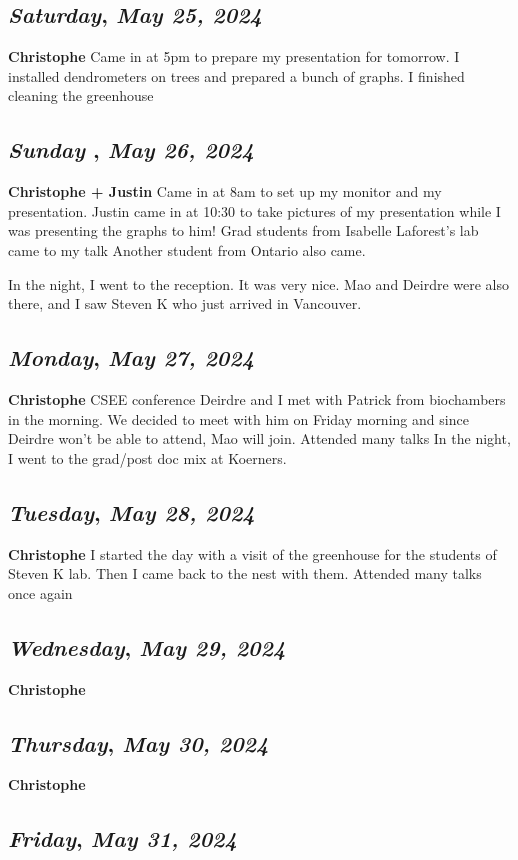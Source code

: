 \def\day{\textit{May 25, 2024}}
\def\weekday{\textit{Saturday}}
\subsection*{\weekday, \day}
\textbf{Christophe}
Came in at 5pm to prepare my presentation for tomorrow. 
I installed dendrometers on trees and prepared a bunch of graphs.
I finished cleaning the greenhouse

\def\day{\textit{May 26, 2024}}
\def\weekday{\textit{Sunday }}
\subsection*{\weekday, \day}
\textbf{Christophe + Justin}
Came in at 8am to set up my monitor and my presentation.
Justin came in at 10:30 to take pictures of my presentation while I was presenting the graphs to him! 
Grad students from Isabelle Laforest's lab came to my talk
Another student from Ontario also came. 

In the night, I went to the reception. It was very nice. Mao and Deirdre were also there, and I saw Steven K who just arrived in Vancouver. 
\def\day{\textit{May 27, 2024}}
\def\weekday{\textit{Monday}}
\subsection*{\weekday, \day}
\textbf{Christophe}
CSEE conference
Deirdre and I met with Patrick from biochambers in the morning. We decided to meet with him on Friday morning and since Deirdre won't be able to attend, Mao will join. 
Attended many talks
In the night, I went to the grad/post doc mix at Koerners. 
\def\day{\textit{May 28, 2024}}
\def\weekday{\textit{Tuesday}}
\subsection*{\weekday, \day}
\textbf{Christophe} 
I started the day with a visit of the greenhouse for the students of Steven K lab. Then I came back to the nest with them.
Attended many talks once again

\def\day{\textit{May 29, 2024}}
\def\weekday{\textit{Wednesday}}
\subsection*{\weekday, \day}
\textbf{Christophe}

\def\day{\textit{May 30, 2024}}
\def\weekday{\textit{Thursday}}
\subsection*{\weekday, \day}
\textbf{Christophe}

\def\day{\textit{May 31, 2024}}
\def\weekday{\textit{Friday}}
\subsection*{\weekday, \day}